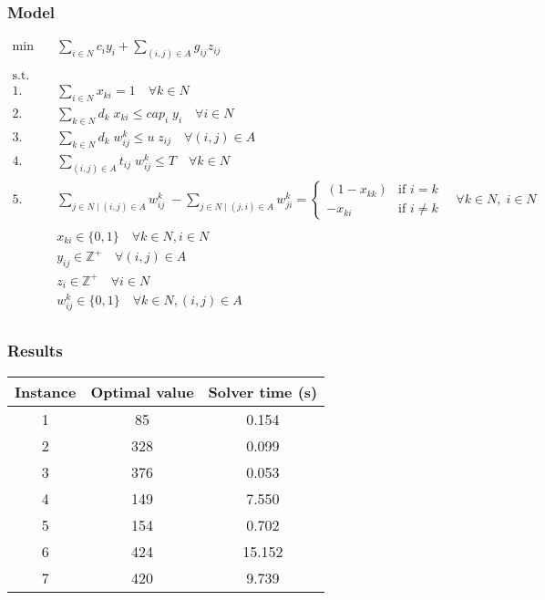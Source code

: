 \subsubsection*{Model}

\begin{align*}
    \min \quad & \sum_{i \in N} c_i y_i + \sum_{(i, j) \in A} g_{ij} z_{ij} & \\
	\\
    \text{s.t.} \quad &  \\
	1. \quad & \sum_{i \in N} x_{ki} = 1 \quad \forall k \in N  \\
	2. \quad & \sum_{k \in N} d_k \; x_{ki} \le cap_i \; y_i \quad \forall i \in N  \\
	3. \quad & \sum_{k \in N} d_k \; w_{ij}^k \le u \; z_{ij} \quad \forall (i, j) \in A \quad  \\
	4. \quad & \sum_{(i, j) \in A} t_{ij} \; w_{ij}^k \le T \quad \forall k \in N  \\
	5. \quad & \sum_{j \in N \mid (i, j) \in A} w_{ij}^k \; - \sum_{j \in N \mid (j, i) \in A} w_{ji}^k = \left\{
	\begin{array}{rl}
		(1 - x_{kk}) & \text{if } i = k  \\
		-x_{ki} & \text{if } i \ne k
	\end{array}
	\right.
	\quad \forall k \in N, \; i \in N  \\
	\\
	& x_{ki} \in \{0, 1\} \quad \forall k \in N, i \in N  \\
	& y_{ij} \in \mathbb{Z}^+ \quad \forall (i, j) \in A  \\
	& z_i \in \mathbb{Z}^+ \quad \forall i \in N  \\
	& w_{ij}^k \in \{0, 1\} \quad \forall k \in N, (i, j) \in A  \\
\end{align*}


\subsubsection*{Results}

\begin{table}[h!]
	\centering
	\begin{tabular}{|c|c|c|}
		\hline
		\textbf{Instance} & \textbf{Optimal value} & \textbf{Solver time (s)} \\
		\hline
		1 & 85  & 0.154 \\
		\hline
		2 & 328 & 0.099 \\
		\hline
		3 & 376 & 0.053 \\
		\hline
		4 & 149 & 7.550 \\
		\hline
		5 & 154 & 0.702 \\
		\hline
		6 & 424 & 15.152 \\
		\hline
		7 & 420 & 9.739 \\
		\hline
	\end{tabular}
	\label{tab:instance_costs}
\end{table}
